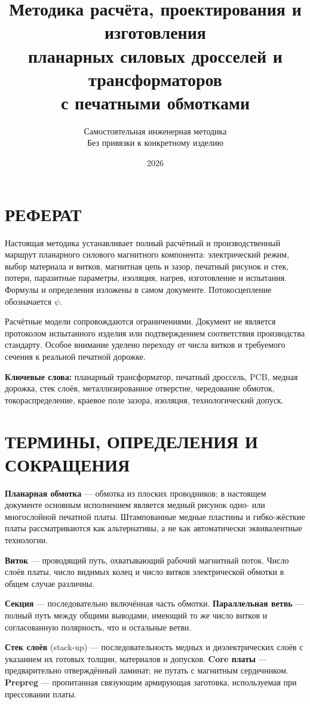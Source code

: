 \documentclass[14pt,a4paper]{extarticle}
\title{Методика расчёта, проектирования и изготовления\\планарных силовых дросселей и трансформаторов\\с печатными обмотками}
\author{Самостоятельная инженерная методика\\Без привязки к конкретному изделию}
\date{2026}
\begin{document}
\maketitle\thispagestyle{empty}\newpage
\section*{РЕФЕРАТ}
Настоящая методика устанавливает полный расчётный и производственный маршрут планарного силового магнитного компонента: электрический режим, выбор материала и витков, магнитная цепь и зазор, печатный рисунок и стек, потери, паразитные параметры, изоляция, нагрев, изготовление и испытания. Формулы и определения изложены в самом документе. Потокосцепление обозначается $\psi$.

Расчётные модели сопровождаются ограничениями. Документ не является протоколом испытанного изделия или подтверждением соответствия производства стандарту. Особое внимание уделено переходу от числа витков и требуемого сечения к реальной печатной дорожке.

\noindent\textbf{Ключевые слова:} планарный трансформатор, печатный дроссель, PCB, медная дорожка, стек слоёв, металлизированное отверстие, чередование обмоток, токораспределение, краевое поле зазора, изоляция, технологический допуск.
\newpage\tableofcontents\newpage
\section*{ТЕРМИНЫ, ОПРЕДЕЛЕНИЯ И СОКРАЩЕНИЯ}
\textbf{Планарная обмотка} --- обмотка из плоских проводников; в настоящем документе основным исполнением является медный рисунок одно- или многослойной печатной платы. Штампованные медные пластины и гибко-жёсткие платы рассматриваются как альтернативы, а не как автоматически эквивалентные технологии.

\textbf{Виток} --- проводящий путь, охватывающий рабочий магнитный поток. Число слоёв платы, число видимых колец и число витков электрической обмотки в общем случае различны.

\textbf{Секция} --- последовательно включённая часть обмотки. \textbf{Параллельная ветвь} --- полный путь между общими выводами, имеющий то же число витков и согласованную полярность, что и остальные ветви.

\textbf{Стек слоёв} (stack-up) --- последовательность медных и диэлектрических слоёв с указанием их готовых толщин, материалов и допусков. \textbf{Core платы} --- предварительно отверждённый ламинат; не путать с магнитным сердечником. \textbf{Prepreg} --- пропитанная связующим армирующая заготовка, используемая при прессовании платы.
\end{document}
